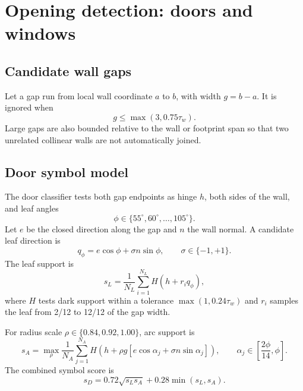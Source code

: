 \documentclass[11pt,a4paper]{article}
\begin{document}
\section{Opening detection: doors and windows}

\subsection{Candidate wall gaps}

Let a gap run from local wall coordinate $a$ to $b$, with width $g=b-a$. It is ignored when
\begin{equation}
g\leq\max(3,0.75\tau_w).
\end{equation}
Large gaps are also bounded relative to the wall or footprint span so that two unrelated collinear walls are not automatically joined.

\subsection{Door symbol model}

The door classifier tests both gap endpoints as hinge $h$, both sides of the wall, and leaf angles
\begin{equation}
\phi\in\{55^\circ,60^\circ,\ldots,105^\circ\}.
\end{equation}
Let $e$ be the closed direction along the gap and $n$ the wall normal. A candidate leaf direction is
\begin{equation}
q_\phi=e\cos\phi+\sigma n\sin\phi,\qquad\sigma\in\{-1,+1\}.
\end{equation}
The leaf support is
\begin{equation}
s_L=\frac{1}{N_L}\sum_{i=1}^{N_L}H\left(h+r_iq_\phi\right),
\end{equation}
where $H$ tests dark support within a tolerance $\max(1,0.24\tau_w)$ and $r_i$ samples the leaf from 2/12 to 12/12 of the gap width.

For radius scale $\rho\in\{0.84,0.92,1.00\}$, arc support is
\begin{equation}
s_A=\max_\rho\frac{1}{N_A}\sum_{j=1}^{N_A}
H\left(h+\rho g\left[e\cos\alpha_j+\sigma n\sin\alpha_j\right]\right),
\qquad \alpha_j\in\left[\frac{2\phi}{14},\phi\right].
\end{equation}
The combined symbol score is
\begin{equation}
s_D=0.72\sqrt{s_Ls_A}+0.28\min(s_L,s_A).
\label{eq:door}
\end{equation}
\end{document}
